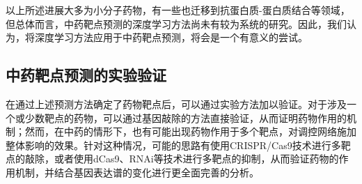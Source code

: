 以上所述进展大多为小分子药物，有一些也迁移到抗蛋白质-蛋白质结合等领域，但总体而言，中药靶点预测的深度学习方法尚未有较为系统的研究。因此，我们认为，将深度学习方法应用于中药靶点预测，将会是一个有意义的尝试。

\subsection{中药靶点预测的实验验证}

在通过上述预测方法确定了药物靶点后，可以通过实验方法加以验证。对于涉及一个或少数靶点的药物，可以通过基因敲除的方法直接验证，从而证明药物作用的机制；然而，在中药的情形下，也有可能出现药物作用于多个靶点，对调控网络施加整体影响的效果。针对这种情况，可能的思路有使用CRISPR/Cas9\cite{Cong_Ran_Cox_Lin_Barretto_Habib_Hsu_Wu_Jiang_Marraffini_et_al._2013}技术进行多靶点的敲除，或者使用dCas9\cite{Jiang_Geng_Wang_Liang_Guo_Liu_Zhao_Jin_Liu_Mu_2023}、RNAi\cite{Zimmermann_Lehár_Keith_2007}等技术进行多靶点的抑制，从而验证药物的作用机制，并结合基因表达谱的变化进行更全面完善的分析。
